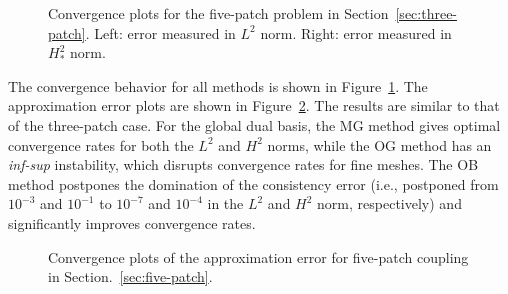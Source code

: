 \begin{figure}[ht]
	\centering
	\begin{subfigure}[b]{0.47\textwidth}
		
	\end{subfigure}
	\hfill
	\begin{subfigure}[b]{0.47\textwidth}
		
	\end{subfigure}

	\begin{subfigure}[b]{0.47\textwidth}
		
	\end{subfigure}
	\hfill
	\begin{subfigure}[b]{0.47\textwidth}
		
	\end{subfigure}
	\caption{Convergence plots for the five-patch problem in Section~\ref{sec:three-patch}. Left: error measured in $L^2$ norm. Right: error measured in $H^2_*$ norm.}\label{fig:five_patc_biharmonic_convergence}
\end{figure}

The convergence behavior for all methods is shown in Figure~\ref{fig:five_patc_biharmonic_convergence}. The approximation error plots are shown in Figure~\ref{fig:five_patch_approximation}. The results are similar to that of the three-patch case. For the global dual basis, the MG method gives optimal convergence rates for both the $L^2$ and $H^2$ norms, while the OG method has an \textit{inf-sup} instability, which disrupts convergence rates for fine meshes. The OB method postpones the domination of the consistency error (i.e., postponed from $10^{-3}$ and $10^{-1}$ to $10^{-7}$ and $10^{-4}$ in the $L^2$ and $H^2$ norm, respectively) and significantly improves convergence rates.

\begin{figure}[ht]
	\centering
	\begin{subfigure}[b]{0.47\textwidth}
		
	\end{subfigure}
	\hfill
	\begin{subfigure}[b]{0.47\textwidth}
		
	\end{subfigure}
	\caption{Convergence plots of the approximation error for five-patch coupling in Section.~\ref{sec:five-patch}.}\label{fig:five_patch_approximation}
\end{figure}
\FloatBarrier

